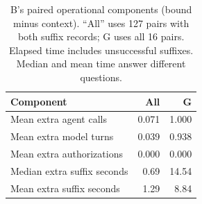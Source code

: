 \documentclass[11pt,a4paper]{article}
\begin{document}
\begin{table}[t]
\centering\small
\caption{B's paired operational components (bound minus context). ``All'' uses 127 pairs with both suffix records; G uses all 16 pairs. Elapsed time includes unsuccessful suffixes. Median and mean time answer different questions.}
\label{tab:friction}
\begin{tabular}{@{}lrr@{}}
\toprule
Component & All & G \\
\midrule
Mean extra agent calls & 0.071 & 1.000 \\
Mean extra model turns & 0.039 & 0.938 \\
Mean extra authorizations & 0.000 & 0.000 \\
Median extra suffix seconds & 0.69 & 14.54 \\
Mean extra suffix seconds & 1.29 & 8.84 \\
\bottomrule
\end{tabular}
\end{table}
\end{document}
